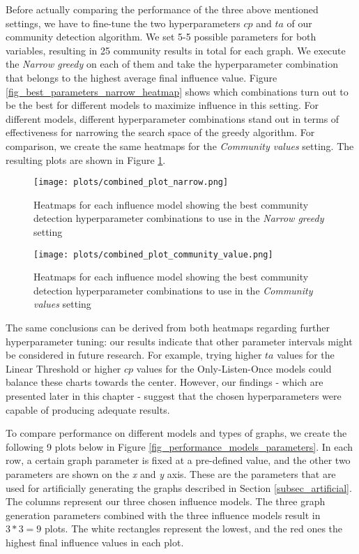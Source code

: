 \documentclass[pdflatex,sn-mathphys-num]{sn-jnl}
\begin{document}
Before actually comparing the performance of the three above mentioned settings, we have to fine-tune the two hyperparameters $cp$ and $ta$ of our community detection algorithm. We set 5-5 possible parameters for both variables, resulting in 25 community results in total for each graph. We execute the \textit{Narrow greedy} on each of them and take the hyperparameter combination that belongs to the highest average final influence value. Figure \ref{fig_best_parameters_narrow_heatmap} shows which combinations turn out to be the best for different models to maximize influence in this setting. For different models, different hyperparameter combinations stand out in terms of effectiveness for narrowing the search space of the greedy algorithm. For comparison, we create the same heatmaps for the \textit{Community values} setting. The resulting plots are shown in Figure \ref{fig_best_parameters_community_value_heatmap}.

\begin{figure}[ht]
\centering
\texttt{[image: plots/combined\_plot\_narrow.png]}
\caption{Heatmaps for each influence model showing the best community detection hyperparameter combinations to use in the \textit{Narrow greedy} setting}
\label{fig_best_parameters_narrow_heatmap}
\vspace{7.5mm}
\texttt{[image: plots/combined\_plot\_community\_value.png]}
\caption{Heatmaps for each influence model showing the best community detection hyperparameter combinations to use in the \textit{Community values} setting}
\label{fig_best_parameters_community_value_heatmap}
\end{figure}

The same conclusions can be derived from both heatmaps regarding further hyperparameter tuning: our results indicate that other parameter intervals might be considered in future research. For example, trying higher $ta$ values for the Linear Threshold or higher $cp$ values for the Only-Listen-Once models could balance these charts towards the center. However, our findings - which are presented later in this chapter - suggest that the chosen hyperparameters were capable of producing adequate results.

To compare performance on different models and types of graphs, we create the following 9 plots below in Figure \ref{fig_performance_models_parameters}. In each row, a certain graph parameter is fixed at a pre-defined value, and the other two parameters are shown on the \textit{x} and \textit{y} axis. These are the parameters that are used for artificially generating the graphs described in Section \ref{subsec_artificial}. The columns represent our three chosen influence models. The three graph generation parameters combined with the three influence models result in $3*3=9$ plots. The white rectangles represent the lowest, and the red ones the highest final influence values in each plot.
\end{document}
